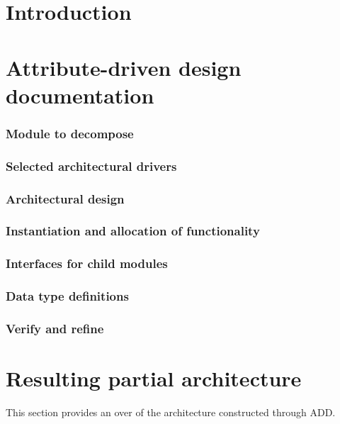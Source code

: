 \documentclass[english]{sareport}
\begin{document}
\maketitle

\tableofcontents

\chapter{Introduction}\label{sec:introduction}

\chapter{Attribute-driven design documentation}\label{sec:add}





\subsection{Module to decompose}
\subsection{Selected architectural drivers}
\subsection{Architectural design}
\subsection{Instantiation and allocation of functionality}
\subsection{Interfaces for child modules}
\subsection{Data type definitions}
\subsection{Verify and refine}

\chapter{Resulting partial architecture}\label{sec:architecture}
This section provides an over of the architecture constructed through ADD\@.
\end{document}
